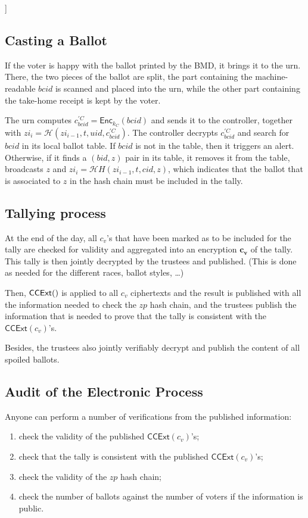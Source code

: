 \documentclass[prodmode]{acmsmall}
\newcommand{\COP}[1]{{\sf [[OP: #1]]}}
\newcommand{\kc}{\ensuremath{k_C}\xspace}
\newcommand{\zp}{\ensuremath{zp}\xspace}
\newcommand{\zi}{\ensuremath{zi}\xspace}
\newcommand{\bid}{\ensuremath{bid}\xspace}   %
\newcommand{\bcid}{\ensuremath{bcid}\xspace} %
\newcommand{\uid}{\ensuremath{uid}\xspace}   %
\newcommand{\cid}{\ensuremath{cid}\xspace}   %
\newcommand{\bmd}{\textsf{BMD}\xspace}       %
\newcommand{\Enc}[2]{\textsf{Enc}_{#1}(#2)\xspace} %
\newcommand{\CCExt}[1]{\textsf{CCExt}(#1)\xspace} %
\newcommand{\hash}{\ensuremath{\mathcal{H}}\xspace} %
\newcommand{\cv}{\ensuremath{c_v}\xspace} %
\newcommand{\pcv}{\ensuremath{\mathbf{c_v}}\xspace} %
\newcommand{\cpbc}{\ensuremath{c^{'C}_{\bcid}}\xspace} %
\begin{document}
\COP{Talk about how to deal with the complain.}

\subsection{Casting a Ballot}
\label{sec:casting-ballot}

If the voter is happy with the ballot printed by the \bmd, it brings
it to the urn. There, the two pieces of the ballot are split, the part
containing the machine-readable \bcid is scanned and placed into the
urn, while the other part containing the take-home receipt is kept by
the voter. 

The urn computes $\cpbc = \Enc{\kc}{\bcid}$ and sends it to the
controller, together with $\zi_i = \hash(\zi_{i-1}, t, \uid,
\cpbc)$. The controller decrypts \cpbc and search for \bcid in its
local ballot table. If \bcid is not in the table, then it triggers an
alert. Otherwise, if it finds a $(\bid, z)$ pair in its table, it
removes it from the table, broadcasts $z$ and $\zi_i =
\hash{H}(\zi_{i-1}, t, \cid, z)$, which indicates that the ballot
that is associated to $z$ in the hash chain must be included in the
tally.

\subsection{Tallying process}
\label{sec:tallying-process}

At the end of the day, all $\cv$'s that have been marked as to be
included for the tally are checked for validity and aggregated into an
encryption $\pcv$ of the tally. This tally is then jointly decrypted
by the trustees and published. (This is done as needed for the
different races, ballot styles, \dots)

Then, $\CCExt$ is applied to all $\cv$ ciphertexts and the result is
published with all the information needed to check the $\zp$ hash
chain, and the trustees publish the information that is needed to
prove that the tally is consistent with the $\CCExt{\cv}$'s.

Besides, the trustees also jointly verifiably decrypt and publish the
content of all spoiled ballots. 

\subsection{Audit of the Electronic Process}
\label{sec:publ-audit-electr}

Anyone can perform a number of verifications from the published information: 
\begin{enumerate}
\item check the validity of the published $\CCExt{\cv}$'s;
\item check that the tally is consistent with the published $\CCExt{\cv}$'s;
\item check the validity of the $\zp$ hash chain; 
\item check the number of ballots against the number of voters if the
  information is public.
\end{enumerate}
\end{document}
